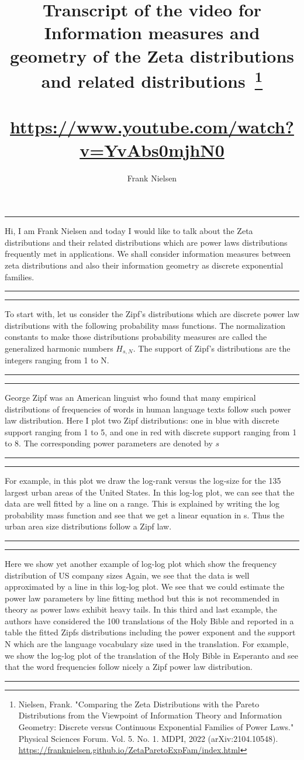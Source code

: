 \documentclass{article}
\title{Transcript of the video for\\
{\bf Information measures and geometry of the Zeta distributions and related distributions~\protect\cite{Zeta-2022}\footnote{Nielsen, Frank. "Comparing the Zeta Distributions with the Pareto Distributions from the Viewpoint of Information Theory and Information Geometry: Discrete versus Continuous Exponential Families of Power Laws." Physical Sciences Forum. Vol. 5. No. 1. MDPI, 2022 (arXiv:2104.10548). \url{https://franknielsen.github.io/ZetaParetoExpFam/index.html}}}\\
\ \\
\url{https://www.youtube.com/watch?v=YvAbs0mjhN0}}
\author{Frank Nielsen}
\date{}
\def\slide#1{
\noindent\hrule
\begin{center}
\begin{minipage}{0.8\textwidth}
#1
\end{minipage}
\end{center}
\noindent\hrule
}
\begin{document}
\maketitle
\slide{Hi, I am Frank Nielsen and today I would like to talk about the Zeta distributions and their related distributions which are power laws distributions frequently met in applications.
We shall consider information measures between zeta distributions and also their information geometry as discrete exponential families.
}

\slide{To start with, let us consider the Zipf’s distributions which are discrete power law distributions with the following probability mass functions.
The normalization constants to make those distributions probability measures are called the generalized harmonic numbers $H_{s,N}$.
The support of Zipf’s distributions are the integers ranging from 1 to N.
}

\slide{
George Zipf was an American linguist who found that many empirical distributions of frequencies of words in human language texts follow such power law distribution.
Here I plot two Zipf distributions: one in blue with discrete support ranging from 1 to 5, and one in red with discrete support ranging from 1 to 8. The corresponding power parameters are denoted by $s$}

\slide{
For example, in this plot we draw the log-rank versus the log-size for the 135 largest urban areas of the United States.
In this log-log plot, we can see that the data are well fitted by a line on a range.
This is explained by writing the log probability mass function and see that we get a linear equation in s.
Thus the urban area size distributions follow a Zipf law.
}


\slide{Here we show yet another example of log-log plot  which show the frequency distribution of US company sizes
Again, we see that the data is well approximated by a line in this log-log plot.
We see that we could estimate the power law parameters by line fitting method but this is not recommended in theory as power laws exhibit heavy tails.
In this third and last example, the authors have considered the 100 translations of the Holy Bible and reported in a table the fitted Zipfs distributions including the power exponent and the support N which are the language vocabulary size used in the translation.
For example, we show the log-log plot of the translation of the Holy Bible in Esperanto and see that the word frequencies follow nicely a Zipf power law distribution.}
\end{document}
